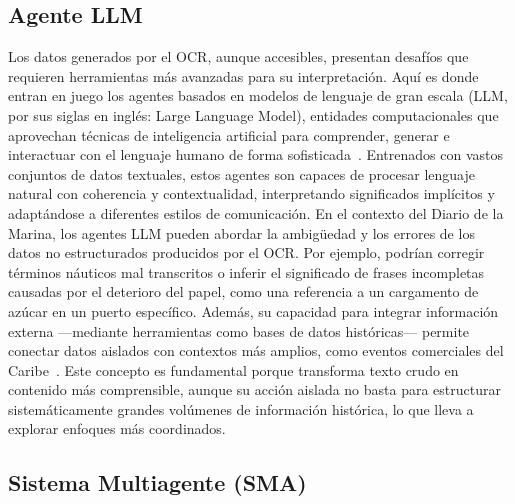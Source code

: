 \subsection{Agente LLM}\label{seq_3}

Los datos generados por el OCR, aunque accesibles, presentan desafíos que requieren herramientas más avanzadas para su interpretación. Aquí es donde entran en juego los agentes basados en modelos de lenguaje de gran escala (LLM, por sus siglas en inglés: Large Language Model), entidades computacionales que aprovechan técnicas de inteligencia artificial para comprender, generar e interactuar con el lenguaje humano de forma sofisticada~\cite{guo2024largelanguage}. Entrenados con vastos conjuntos de datos textuales, estos agentes son capaces de procesar lenguaje natural con coherencia y contextualidad, interpretando significados implícitos y adaptándose a diferentes estilos de comunicación.
En el contexto del Diario de la Marina, los agentes LLM pueden abordar la ambigüedad y los errores de los datos no estructurados producidos por el OCR. Por ejemplo, podrían corregir términos náuticos mal transcritos o inferir el significado de frases incompletas causadas por el deterioro del papel, como una referencia a un cargamento de azúcar en un puerto específico. Además, su capacidad para integrar información externa —mediante herramientas como bases de datos históricas— permite conectar datos aislados con contextos más amplios, como eventos comerciales del Caribe~\cite{guo2024largelanguage}. Este concepto es fundamental porque transforma texto crudo en contenido más comprensible, aunque su acción aislada no basta para estructurar sistemáticamente grandes volúmenes de información histórica, lo que lleva a explorar enfoques más coordinados.


\subsection{Sistema Multiagente (SMA)}\label{seq_2}


